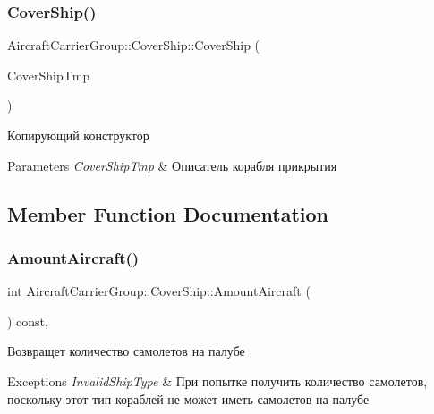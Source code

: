\subsubsection{\texorpdfstring{Cover\+Ship()}{CoverShip()}\hspace{0.1cm}{\footnotesize\ttfamily [2/2]}}
{\footnotesize\ttfamily Aircraft\+Carrier\+Group\+::\+Cover\+Ship\+::\+Cover\+Ship (\begin{DoxyParamCaption}\item[{const \mbox{\hyperlink{class_aircraft_carrier_group_1_1_cover_ship}{Cover\+Ship}} \&}]{Cover\+Ship\+Tmp }\end{DoxyParamCaption})}



Копирующий конструктор 


\begin{DoxyParams}{Parameters}
{\em Cover\+Ship\+Tmp} & Описатель корабля прикрытия \\
\hline
\end{DoxyParams}


\subsection{Member Function Documentation}
\mbox{\label{class_aircraft_carrier_group_1_1_cover_ship_ac53b388322ccc63153ffc6edd2811d7c}} 
\subsubsection{\texorpdfstring{Amount\+Aircraft()}{AmountAircraft()}}
{\footnotesize\ttfamily int Aircraft\+Carrier\+Group\+::\+Cover\+Ship\+::\+Amount\+Aircraft (\begin{DoxyParamCaption}{ }\end{DoxyParamCaption}) const\hspace{0.3cm}{\ttfamily [inline]}, {\ttfamily [virtual]}}



Возвращет количество самолетов на палубе 


\begin{DoxyExceptions}{Exceptions}
{\em Invalid\+Ship\+Type} & При попытке получить количество самолетов, поскольку этот тип кораблей не может иметь самолетов на палубе \\
\hline
\end{DoxyExceptions}


